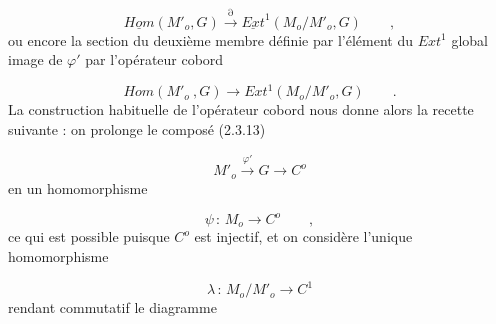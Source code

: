 \begin{equation*}
\underline{Hom}(M'_o,G) \overset{\partial}{\longrightarrow} \underline{Ext}^1(M_o/M'_o,G) \qquad ,
\end{equation*}
ou encore la section du deuxième membre définie par l'élément du $Ext^1$ global image de $\varphi'$ par l'opérateur cobord

\begin{equation*}
Hom(M'_o\ ,G) \longrightarrow Ext^1(M_o/M'_o,G) \qquad .
\end{equation*}
La construction habituelle de l'opérateur cobord nous donne alors la recette suivante : on prolonge le composé (2.3.13)

\begin{equation*}
M'_o \overset{\varphi'}{\longrightarrow} G \longrightarrow C^o
\end{equation*}
en un homomorphisme

\begin{equation*}
\psi \, : \, M_o \longrightarrow C^o \qquad ,
\end{equation*}
ce qui est possible puisque $C^o$ est injectif, et on considère l'unique homomorphisme

\begin{equation}\tag{2.3.15}
\lambda \, : \, M_o/M'_o \longrightarrow C^1
\end{equation}
rendant commutatif le diagramme

\begin{center}
\end{center}


